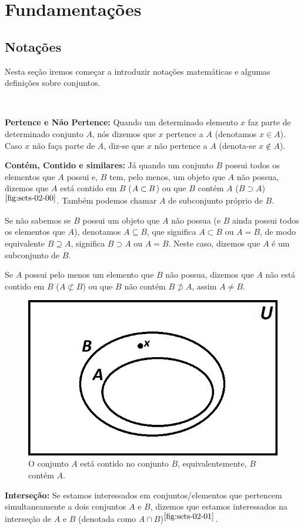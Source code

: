 \section{Fundamentações}
\subsection{Notações}
Nesta seção iremos começar a introduzir notações matemáticas e algumas definições sobre conjuntos.

$\qquad$

\textbf{Pertence e Não Pertence:} Quando um determinado elemento $x$ faz parte de determinado conjunto $A$, nós dizemos que $x$ pertence a $A$ (denotamos $x \in A$). Caso $x$ não faça parte de $A$, diz-se que $x$ não pertence a $A$ (denota-se  $x \notin A$).

\textbf{Contém, Contido e similares:} Já quando um conjunto $B$ possui todos os elementos que $A$ possui e, $B$ tem, pelo menos, um objeto que $A$ não possua, dizemos que $A$ está contido em $B$ ($\space A \subset B$) ou que $B$ contém $A$ ($B \supset A$)$^{\ref{fig:sets-02-00}}$.  Também podemos chamar $A$ de subconjunto próprio de $B$.

Se não sabemos se $B$ possui um objeto que $A$ não possua (e $B$ ainda possui todos os elementos que $A$), denotamos $A \subseteq B$, que significa $A \subset B$ ou $A=B$, de modo equivalente $B \supseteq A$, significa $B \supset A$ ou $A=B$. Neste caso, dizemos que $A$ é um subconjunto de $B$.


Se $A$ possui pelo menos um elemento que $B$ não possua, dizemos que $A$ não está contido em $B$ ($A \not\subset B$) ou que $B$ não contém $B\not\supset A$, assim $A \neq B$.

\begin{figure}[hbt!]
  \centering
  \includegraphics[width = 7 cm]{figures/sets/fig-sets-02-00.png}
  \caption{O conjunto $A$ está contido no conjunto $B$, equivalentemente, $B$ contém $A$.}
  \label{fig:sets-02-00}
\end{figure}

\textbf{Interseção:} Se estamos interessados em conjuntos/elementos que pertencem simultaneamente a dois conjuntos $A$ e $B$, dizemos que estamos interessados na interseção de $A$ e $B$ (denotada como $A \cap B$)$^{\ref{fig:sets-02-01}}$.

